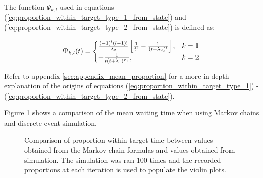 The function \(\Psi_{k,l}\) used in equations 
(\ref{eq:proportion_within_target_type_1_from_state}) and 
(\ref{eq:proportion_within_target_type_2_from_state}) is defined as:

\begin{equation}
    \Psi_{k,l}(t) = 
    \begin{cases} 
        \frac{(-1)^{l} (l-1)!}{\lambda_2} \left[\frac{1}{t^l} - \frac{1}
        {(t + \lambda_2)^l}\right] , & k=1 \\
        - \frac{1}{t (t + \lambda_1)^{r_1}}, & k=2
    \end{cases} \nonumber \\
\end{equation}

Refer to appendix \ref{sec:appendix_mean_proportion} for a more in-depth 
explanation of the origins of equations 
(\ref{eq:proportion_within_target_type_1}) - 
(\ref{eq:proportion_within_target_type_2_from_state}).


Figure \ref{fig:markov_vs_des_proportion_comparison} shows a comparison of the
mean waiting time when using Markov chains and discrete event simulation.

\begin{figure}[ht]
    \centering
    \caption{
        Comparison of proportion within target time between values obtained 
        from the Markov chain formulas and values obtained from simulation. 
        The simulation was ran 100 times and the recorded proportions at each
        iteration is used to populate the violin plots.
    }
    \label{fig:markov_vs_des_proportion_comparison}
\end{figure}
 